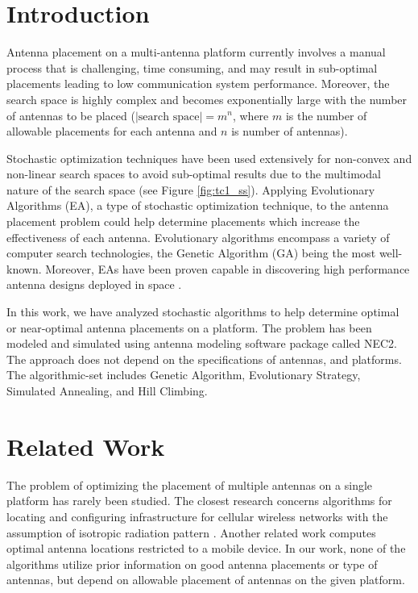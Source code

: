 \documentclass[conference]{IEEEtran}
\begin{document}
\section{Introduction}
Antenna placement on a multi-antenna platform currently involves a manual process that is challenging, time consuming, and may result in sub-optimal placements leading to low communication system performance. Moreover, the search space is highly complex and becomes exponentially large with the number of antennas to be placed ($|\text{search space}| = m^n$, where $m$ is the number of allowable placements for each antenna and $n$ is number of antennas). 

Stochastic optimization techniques have been used extensively for non-convex and non-linear search spaces to avoid sub-optimal results due to the multimodal nature of the search space (see Figure \ref{fig:tc1_ss}). Applying Evolutionary Algorithms (EA), a type of stochastic optimization technique, to the antenna placement problem could help determine placements which increase the effectiveness of each antenna. Evolutionary algorithms encompass a variety of computer search technologies, the Genetic Algorithm (GA) being the most well-known. Moreover, EAs have been proven capable in discovering high performance antenna designs deployed in space \cite{lohn2005evolutionary}. 

In this work, we have analyzed stochastic algorithms to help determine optimal or near-optimal antenna placements on a platform. The problem has been modeled and simulated using antenna modeling software package called NEC2. The approach does not depend on the specifications of antennas, and platforms. The algorithmic-set includes Genetic Algorithm, Evolutionary Strategy, Simulated Annealing, and Hill Climbing.

\section{Related Work}
\label{sec:related}
The problem of optimizing the placement of multiple antennas on a single platform has rarely been studied.  The closest research concerns algorithms for locating and configuring infrastructure for cellular wireless networks with the assumption of isotropic radiation pattern \cite{rais2005}. Another related work computes optimal antenna locations restricted to a mobile device. In our work, none of the algorithms utilize prior information on good antenna placements or type of antennas, but depend on allowable placement of antennas on the given platform.
\end{document}
